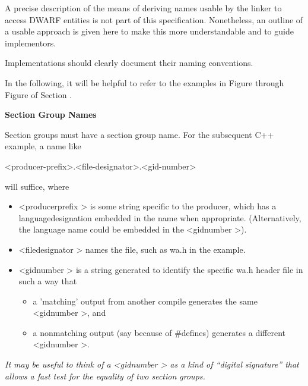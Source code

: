 A precise description of the means of deriving names usable
by the linker to access DWARF entities is not part of this
specification. Nonetheless, an outline of a usable approach
is given here to make this more understandable and to guide
implementors.

Implementations should clearly document their naming conventions.

In the following, it will be helpful to refer to the examples
in 
Figure 
through 
Figure 
of 
Section .

\textbf{Section Group Names}

Section groups must have a section group name. For the subsequent C++ example, a name like

<producer-prefix>.<file-designator>.<gid-number>

will suffice, where

\begin{itemize}

\item  \textless producer\dash prefix \textgreater 
is some string specific to the
producer, which has a language\dash designation embedded in the
name when appropriate. (Alternatively, the language name
could be embedded in the 
\textless gid\dash number \textgreater).


\item  \textless file\dash designator \textgreater
names the file, such as wa.h in
the example.


\item  \textless gid\dash number \textgreater
is a string generated to identify the
specific wa.h header file in such a way that

\begin{itemize}

\item  a 'matching' output from another compile generates
the same 
\textless gid\dash number \textgreater,
and

\item  a non\dash matching output (say because of \#defines)
generates a different 
\textless gid\dash number \textgreater.
\end{itemize}

\end{itemize}

\textit{It may be useful to think of a 
\textless gid\dash number \textgreater
as a kind
of ``digital signature'' that allows a fast test for the
equality of two section groups.}

